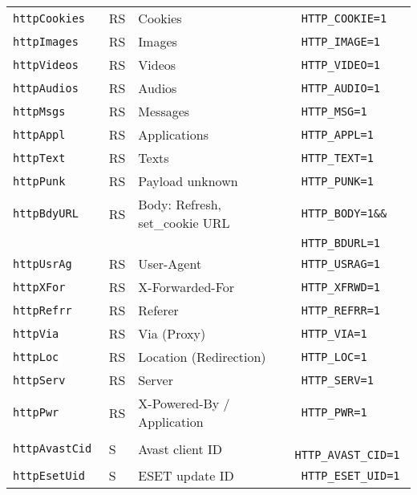 \documentclass[documentation]{subfiles}
\begin{document}
\begin{longtable}{>{\tt}lll>{\tt\small}l}
    httpCookies               & RS    & Cookies                                           & HTTP\_COOKIE=1\\
    httpImages                & RS    & Images                                            & HTTP\_IMAGE=1\\
    httpVideos                & RS    & Videos                                            & HTTP\_VIDEO=1\\
    httpAudios                & RS    & Audios                                            & HTTP\_AUDIO=1\\
    httpMsgs                  & RS    & Messages                                          & HTTP\_MSG=1\\
    httpAppl                  & RS    & Applications                                      & HTTP\_APPL=1\\
    httpText                  & RS    & Texts                                             & HTTP\_TEXT=1\\
    httpPunk                  & RS    & Payload unknown                                   & HTTP\_PUNK=1\\
    httpBdyURL                & RS    & Body: Refresh, set\_cookie URL                    & HTTP\_BODY=1\&\&\\
                              &       &                                                   & HTTP\_BDURL=1\\
    httpUsrAg                 & RS    & User-Agent                                        & HTTP\_USRAG=1\\
    httpXFor                  & RS    & X-Forwarded-For                                   & HTTP\_XFRWD=1\\
    httpRefrr                 & RS    & Referer                                           & HTTP\_REFRR=1\\
    httpVia                   & RS    & Via (Proxy)                                       & HTTP\_VIA=1\\
    httpLoc                   & RS    & Location (Redirection)                            & HTTP\_LOC=1\\
    httpServ                  & RS    & Server                                            & HTTP\_SERV=1\\
    httpPwr                   & RS    & X-Powered-By / Application                        & HTTP\_PWR=1\\
    httpAvastCid              & S     & Avast client ID                                   & HTTP\_AVAST\_CID=1\\
    httpEsetUid               & S     & ESET update ID                                    & HTTP\_ESET\_UID=1\\
    \bottomrule
\end{longtable}
\end{document}

